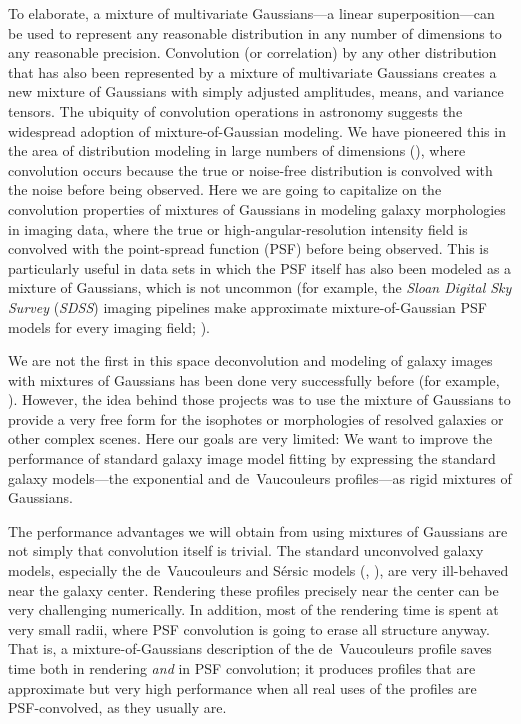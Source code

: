 \documentclass[12pt,pdftex,preprint]{aastex}
\newcommand{\project}[1]{\textsl{#1}}
\newcommand{\sdss}{\project{SDSS}}
\begin{document}
To elaborate, a mixture of multivariate Gaussians---a linear
superposition---can be used to represent any reasonable distribution
in any number of dimensions to any reasonable precision.  Convolution
(or correlation) by any other distribution that has also been
represented by a mixture of multivariate Gaussians creates a new
mixture of Gaussians with simply adjusted amplitudes, means, and
variance tensors.  The ubiquity of convolution operations in astronomy
suggests the widespread adoption of mixture-of-Gaussian modeling.  We
have pioneered this in the area of distribution modeling in large
numbers of dimensions (\citealt{xd, xdqso, xdqsoz}), where convolution
occurs because the true or noise-free distribution is convolved with
the noise before being observed.  Here we are going to capitalize on
the convolution properties of mixtures of Gaussians in modeling galaxy
morphologies in imaging data, where the true or
high-angular-resolution intensity field is convolved with the
point-spread function (PSF) before being observed.  This is
particularly useful in data sets in which the PSF itself has also been
modeled as a mixture of Gaussians, which is not uncommon (for example,
the \project{Sloan Digital Sky Survey} (\sdss) imaging pipelines
make approximate mixture-of-Gaussian PSF models for
every imaging field; \citealt{lupton}).

We are not the first in this space deconvolution and modeling of
galaxy images with mixtures of Gaussians has been done very
successfully before (for example, \citealt{bendinelli, emsellem,
  bendinelli2, cappellari}).  However, the idea behind those projects
was to use the mixture of Gaussians to provide a very free form for
the isophotes or morphologies of resolved galaxies or other complex
scenes.  Here our goals are very limited: We want to improve the
performance of standard galaxy image model fitting by expressing the
standard galaxy models---the exponential and de~Vaucouleurs
profiles---as rigid mixtures of Gaussians.

The performance advantages we will obtain from using mixtures of
Gaussians are not simply that convolution itself is trivial.  The
standard unconvolved galaxy models, especially the de~Vaucouleurs and
S\'ersic models (\citealt{dev}, \citealt{ser}), are very ill-behaved
near the galaxy center.  Rendering these profiles precisely near the
center can be very challenging numerically.  In addition, most of the
rendering time is spent at very small radii, where PSF convolution is
going to erase all structure anyway.  That is, a mixture-of-Gaussians
description of the de~Vaucouleurs profile saves time both in rendering
\emph{and} in PSF convolution; it produces profiles that are
approximate but very high performance when all real uses of the
profiles are PSF-convolved, as they usually are.
\end{document}
